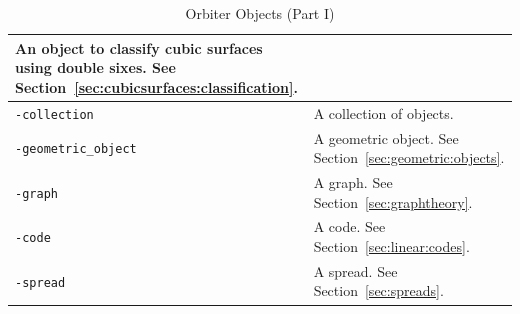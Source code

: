 \begin{table}
\begin{center}
\begin{tabular}{|p{7cm}|p{7cm}|}
		An object to classify cubic surfaces using double sixes. See Section~\ref{sec:cubicsurfaces:classification}.\\
		\hline
		\verb'-collection' &      A collection of objects.\\
		\hline
		\verb'-geometric_object' &     A geometric object. See Section~\ref{sec:geometric:objects}.\\
		\hline
		\verb'-graph' &     A graph. See Section~\ref{sec:graphtheory}.\\
		\hline
		\verb'-code' &     A code. See Section~\ref{sec:linear:codes}.\\
		\hline
		\verb'-spread' &     A spread. See Section~\ref{sec:spreads}.\\
		\hline
		\end{tabular}
	\end{center}
	\caption{\label{tab:define:1}Orbiter Objects (Part I)}
\end{table}
